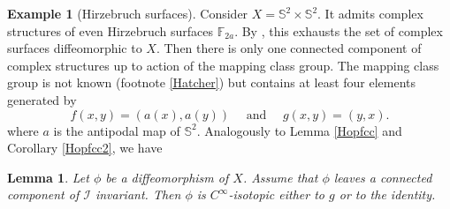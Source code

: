\documentclass[JEP,XML,SOM,Unicode]{cedram}
\let\mathcal\mathscr
\theoremstyle{plain}
\newtheorem{lemma}[theorem]{Lemma}
\theoremstyle{definition}
\newtheorem{example}[theorem]{Example}
\theoremstyle{remark}
\numberwithin{equation}{section}
\newcommand{\cI}{\mathcal{I}}
\begin{document}
\begin{example}[Hirzebruch surfaces]
\label{Hirzebruch}
Consider $X=\mathbb S^2\times\mathbb S^2$. It admits complex structures of even Hirzebruch surfaces $\mathbb F_{2a}$. By \cite{F-Q}, this exhausts the set of complex surfaces diffeomorphic to $X$. Then there is only one connected component of complex structures up to action of the mapping class group. The mapping class group is not known (\cf footnote \ref{Hatcher}) but contains at least four elements generated by
\[
f(x,y)=(a(x),a(y))\quad\text{ and }\quad g(x,y)=(y,x).
\]
where $a$ is the antipodal map of $\mathbb S^2$. Analogously to Lemma \ref{Hopfcc} and Corollary \ref{Hopfcc2}, we have
\begin{lemma}
\label{Hirzebruchcc}
Let $\phi$ be a diffeomorphism of $X$. Assume that $\phi$ leaves a connected component of $\cI$ invariant. Then $\phi$ is $C^\infty$-isotopic either to $g$ or to the identity.
\end{lemma}


\end{example}
\end{document}

